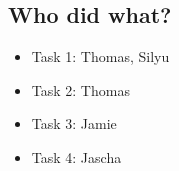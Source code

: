 \subsection{Who did what?}
\begin{itemize}
    \item Task 1: Thomas, Silyu
    \item Task 2: Thomas
    \item Task 3: Jamie
    \item Task 4: Jascha
\end{itemize}